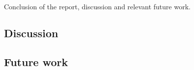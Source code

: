 Conclusion of the report, discussion and relevant future work.

\subsection{Discussion}
\label{sec:Discussion}

\subsection{Future work}
\label{sec:future_work}